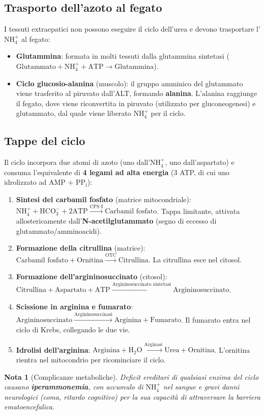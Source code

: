 \documentclass[12pt,a4paper]{report}
\newtheorem{nota}{Nota}[section]
\begin{document}
\subsection{Trasporto dell'azoto al fegato}
I tessuti extraepatici non possono eseguire il ciclo dell'urea e devono trasportare l'\(\mathrm{NH_4^+}\) al fegato:
\begin{itemize}
\item \textbf{Glutammina}: formata in molti tessuti dalla glutammina sintetasi (\(\text{Glutammato} + \mathrm{NH_4^+} + \mathrm{ATP} \rightarrow \text{Glutammina}\)).
\item \textbf{Ciclo glucosio-alanina} (muscolo): il gruppo amminico del glutammato viene trasferito al piruvato dall'ALT, formando \textbf{alanina}. L'alanina raggiunge il fegato, dove viene riconvertita in piruvato (utilizzato per gluconeogenesi) e glutammato, dal quale viene liberato \(\mathrm{NH_4^+}\) per il ciclo.
\end{itemize}
\subsection{Tappe del ciclo}
Il ciclo incorpora due atomi di azoto (uno dall'\(\mathrm{NH_4^+}\), uno dall'aspartato) e consuma l'equivalente di \textbf{4 legami ad alta energia} (3 ATP, di cui uno idrolizzato ad AMP + \(\mathrm{PP_i}\)):
\begin{enumerate}
\item \textbf{Sintesi del carbamil fosfato} (matrice mitocondriale): \(\mathrm{NH_4^+} + \mathrm{HCO_3^-} + 2\mathrm{ATP} \xrightarrow{\text{CPS I}} \text{Carbamil fosfato}\). Tappa limitante, attivata allostericamente dall'\textbf{N-acetilglutammato} (segno di eccesso di glutammato/amminoacidi).
\item \textbf{Formazione della citrullina} (matrice): \(\text{Carbamil fosfato} + \text{Ornitina} \xrightarrow{\text{OTC}} \text{Citrullina}\). La citrullina esce nel citosol.
\item \textbf{Formazione dell'argininosuccinato} (citosol): \(\text{Citrullina} + \text{Aspartato} + \mathrm{ATP} \xrightarrow{\text{Argininosuccinato sintetasi}} \text{Argininosuccinato}\).
\item \textbf{Scissione in arginina e fumarato}: \(\text{Argininosuccinato} \xrightarrow{\text{Argininosuccinasi}} \text{Arginina} + \text{Fumarato}\). Il fumarato entra nel ciclo di Krebs, collegando le due vie.
\item \textbf{Idrolisi dell'arginina}: \(\text{Arginina} + \mathrm{H_2O} \xrightarrow{\text{Arginasi}} \text{Urea} + \text{Ornitina}\). L'ornitina rientra nel mitocondrio per ricominciare il ciclo.
\end{enumerate}
\begin{nota}[Complicanze metaboliche]
Deficit ereditari di qualsiasi enzima del ciclo causano \textbf{iperammonemia}, con accumulo di \(\mathrm{NH_4^+}\) nel sangue e gravi danni neurologici (coma, ritardo cognitivo) per la sua capacità di attraversare la barriera ematoencefalica.
\end{nota}
\end{document}
